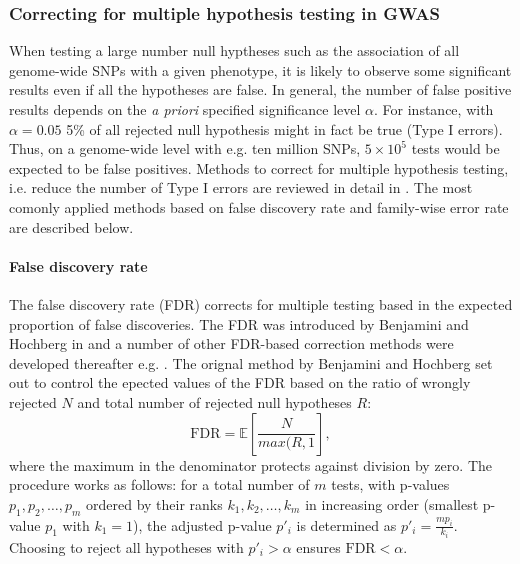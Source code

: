 \subsubsection{Correcting for multiple hypothesis testing in GWAS}
\label{subsection:multiple-testing}
When testing a large number null hyptheses such as the association of all genome-wide SNPs with a given phenotype, it is likely to observe some significant results even if all the hypotheses are false. In general, the number of false positive results depends on the \textit{a priori} specified significance level \(\alpha\). For instance, with  \(\alpha=0.05\) 5\% of all rejected null hypothesis might in fact be true (Type I errors). Thus, on a genome-wide level with e.g. ten million SNPs, \(5 \times 10^5\) tests would be expected to be false positives. Methods to correct for multiple hypothesis testing, i.e. reduce the number of Type I errors are reviewed in detail in \citep{Shaffer1995}. The most comonly applied methods based on false discovery rate and family-wise error rate are described below.

\paragraph{False discovery rate}
The false discovery rate (FDR) corrects for multiple testing based in the expected proportion of false discoveries. The FDR was introduced by Benjamini and Hochberg in \citeyear{Benjamini1995} and a number of other FDR-based correction methods were developed thereafter e.g. \citep{Storey2002Donoho2006,Sarkar2008}. The orignal method by Benjamini and Hochberg set out to control the epected values of the FDR based on the ratio of wrongly rejected \(N\) and total number of rejected null hypotheses \(R\):
\begin{equation}
\text{FDR} = \mathbb{E} \left[\frac{N}{max(R,1} \right],
\end{equation}
where the maximum in the denominator protects against division by zero. The procedure works as follows: for a total number of \(m\) tests, with p-values \(p_1, p_2, \dots, p_m\) ordered by  their ranks  \(k_1, k_2, \dots, k_m\) in increasing order (smallest p-value \(p_1\) with \(k_1=1\)), the adjusted p-value \(p'_i\) is determined as \(p'_i = \frac{mp_i}{k_i}\). Choosing to reject all hypotheses with \(p'_i > \alpha\) ensures \(\text{FDR} < \alpha\). 

